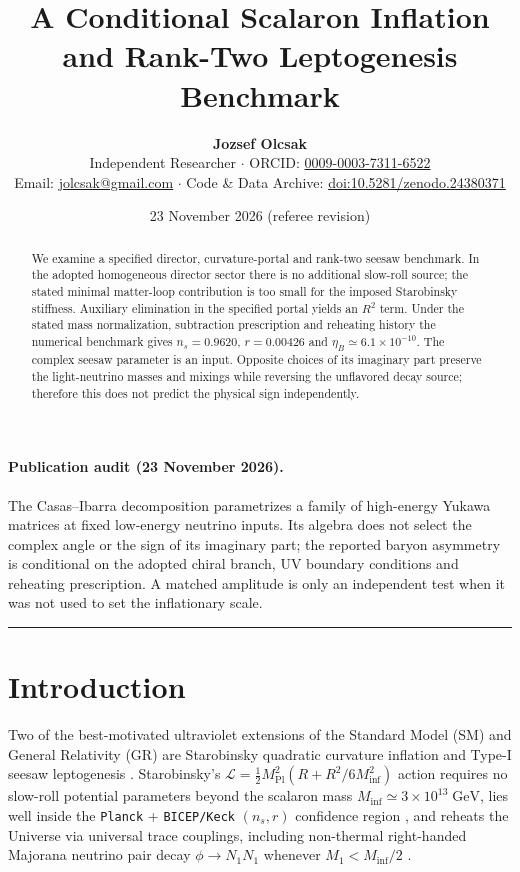 \documentclass[11pt,a4paper]{article}
\title{A Conditional Scalaron Inflation and Rank-Two Leptogenesis Benchmark}
\author{\textbf{Jozsef Olcsak}\\
\small Independent Researcher $\cdot$ ORCID: \href{https://orcid.org/0009-0003-7311-6522}{0009-0003-7311-6522}\\
\small Email: \href{mailto:jolcsak@gmail.com}{jolcsak@gmail.com} $\cdot$ Code \& Data Archive: \href{https://doi.org/10.5281/zenodo.24380371}{doi:10.5281/zenodo.24380371}}
\date{23 November 2026 (referee revision)}
\begin{document}
\maketitle

\begin{abstract}
\noindent We examine a specified director, curvature-portal and rank-two seesaw benchmark. In the adopted homogeneous director sector there is no additional slow-roll source; the stated minimal matter-loop contribution is too small for the imposed Starobinsky stiffness. Auxiliary elimination in the specified portal yields an $R^2$ term. Under the stated mass normalization, subtraction prescription and reheating history the numerical benchmark gives $n_s=0.9620$, $r=0.00426$ and $\eta_B\simeq6.1\times10^{-10}$. The complex seesaw parameter is an input. Opposite choices of its imaginary part preserve the light-neutrino masses and mixings while reversing the unflavored decay source; therefore this does not predict the physical sign independently.
\end{abstract}

\paragraph{Publication audit (23 November 2026).}
The Casas--Ibarra decomposition parametrizes a family of high-energy
Yukawa matrices at fixed low-energy neutrino inputs. Its algebra does not
select the complex angle or the sign of its imaginary part; the reported
baryon asymmetry is conditional on the adopted chiral branch, UV boundary
conditions and reheating prescription. A matched amplitude is only an
independent test when it was not used to set the inflationary scale.


\tableofcontents
\vspace{0.4em}
\hrule
\vspace{0.8em}

\section{Introduction}
\label{sec:intro}

Two of the best-motivated ultraviolet extensions of the Standard Model (SM) and General Relativity (GR) are Starobinsky quadratic curvature inflation \cite{Starobinsky1980,MukhanovChibisov1981} and Type-I seesaw leptogenesis \cite{FukugitaYanagida1986,BuchmullerDiBariPlumacher2005}. Starobinsky's $\mathcal{L} = \frac{1}{2}M_{\mathrm{Pl}}^2(R + R^2/6M_{\mathrm{inf}}^2)$ action requires no slow-roll potential parameters beyond the scalaron mass $M_{\mathrm{inf}} \simeq 3\times 10^{13}\;\mathrm{GeV}$, lies well inside the \texttt{Planck} + \texttt{BICEP/Keck} $(n_s, r)$ confidence region \cite{Planck2018Inflation,BICEPKeck2021}, and reheats the Universe via universal trace couplings, including non-thermal right-handed Majorana neutrino pair decay $\phi \to N_1 N_1$ whenever $M_1 < M_{\mathrm{inf}}/2$ \cite{GorbunovPanin2011,Watanabe2011,GorbunovTokareva2013}.
\end{document}
